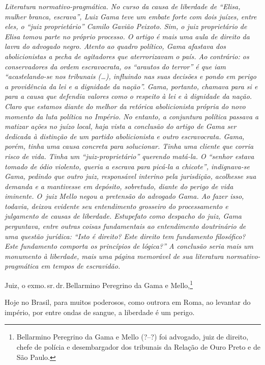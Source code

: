 {\begin{resumo}
\emph{Literatura normativo-pragmática. No curso da causa de liberdade de
``Elisa, mulher branca, escrava'', Luiz Gama teve um embate forte com
dois juízes, entre eles, o ``juiz proprietário'' Camilo Gavião Peixoto.
Sim, o juiz proprietário de Elisa tomou parte no próprio processo. O
artigo é mais uma aula de direito da lavra do advogado negro. Atento ao
quadro político, Gama afastava dos abolicionistas a pecha de agitadores
que aterrorizavam o país. Ao contrário: os conservadores da ordem
escravocrata, os ``arautos do terror'' é que iam ``acastelando-se nos
tribunais (\ldots{}), influindo nas suas decisões e pondo em perigo a
providência da lei e a dignidade da nação''. Gama, portanto, chamava para
si e para a causa que defendia valores como o respeito à lei e à
dignidade da nação. Claro que estamos diante do melhor da retórica
abolicionista própria do novo momento da luta política no Império. No
entanto, a conjuntura política passava a matizar ações no juízo local,
haja vista a conclusão do artigo de Gama ser dedicada à distinção de um
partido abolicionista e outro escravocrata. Gama, porém, tinha uma causa
concreta para solucionar. Tinha uma cliente que corria risco de vida.
Tinha um ``juiz-proprietário'' querendo matá-la. O ``senhor estava tomado
de ódio violento, queria a escrava para picá-la a chicote'', indignava-se
Gama, pedindo que outro juiz, responsável interino pela jurisdição,
acolhesse sua demanda e a mantivesse em depósito, sobretudo, diante do
perigo de vida iminente. O~juiz Mello negou a pretensão do advogado
Gama. Ao fazer isso, todavia, deixou evidente seu entendimento grosseiro
do processamento e julgamento de causas de liberdade. Estupefato como
despacho do juiz, Gama perguntava, entre outras coisas fundamentais ao
entendimento doutrinário de uma questão jurídica: ``Isto é direito? Este
direito tem fundamento filosófico? Este fundamento comporta os
princípios de lógica?'' A conclusão seria mais um monumento à liberdade,
mais uma página memorável de sua literatura normativo-pragmática em
tempos de escravidão.}
\end{resumo}

Juiz, o exmo.\,sr.\,dr.\,Bellarmino Peregrino da Gama e
Mello,\footnote{Bellarmino Peregrino da Gama e Mello (?--?) foi \label{bellarmino}
  advogado, juiz de direito, chefe de polícia e desembargador dos
  tribunais da Relação de Ouro Preto e de São Paulo.}

Hoje no Brasil, para muitos poderosos, como outrora em Roma, ao levantar
do império, por entre ondas de sangue, a liberdade é um perigo.

}

